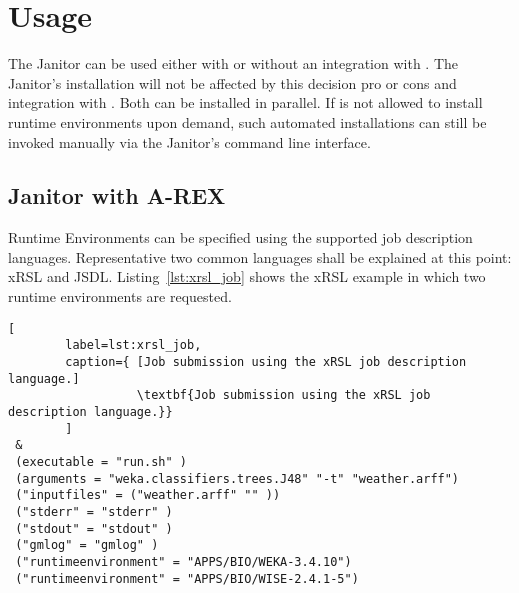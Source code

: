 \chapter{Usage}

The Janitor can be used either with or without an integration with \AREX. The Janitor's installation will not be affected
by this decision pro or cons and integration with \AREX. Both can be installed in parallel. If \AREX is not allowed to
install runtime environments upon demand, such automated installations can still be invoked manually via the Janitor's
command line  interface.

\section{Janitor with A-REX}

Runtime Environments can be specified using the supported job description languages.
Representative two common languages shall be explained at this point: xRSL and JSDL.
Listing~\ref{lst:xrsl_job} shows the xRSL example in which two runtime environments are requested.

\begin{lstlisting}[
        label=lst:xrsl_job,
        caption={ [Job submission using the xRSL job description language.]
                  \textbf{Job submission using the xRSL job description language.}}
        ]
 &
 (executable = "run.sh" )
 (arguments = "weka.classifiers.trees.J48" "-t" "weather.arff")
 ("inputfiles" = ("weather.arff" "" ))
 ("stderr" = "stderr" )
 ("stdout" = "stdout" )
 ("gmlog" = "gmlog" )
 ("runtimeenvironment" = "APPS/BIO/WEKA-3.4.10")
 ("runtimeenvironment" = "APPS/BIO/WISE-2.4.1-5")
\end{lstlisting}

